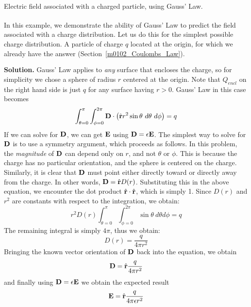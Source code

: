 ~\\ \begin{example} 
\begin{mdframed}[backgroundcolor=brown!20,linecolor=brown!20]\raggedright
Electric field associated with a charged particle, using Gauss' Law.
\\~\\
In this example, we demonstrate the ability of Gauss' Law to predict the field associated with a charge distribution.
Let us do this for the simplest possible charge distribution. A particle of charge $q$ located at the origin, for which we already have the answer (Section~\ref{m0102_Coulombs_Law}).

{\bf Solution.}
Gauss' Law applies to {\it any} surface that encloses the charge, so for simplicity we chose a sphere of radius $r$ centered at the origin.  Note that $Q_{encl}$ on the right hand side is just $q$ for any surface having $r>0$.  Gauss' Law in this case becomes
%
\begin{equation}   
\int_{\theta=0}^{\pi} \int_{\phi=0}^{2\pi} { {\bf D} \cdot \left(\hat{\bf r}r^2 \sin\theta~d\theta~d\phi\right) } = q 
\end{equation}
%
If we can solve for ${\bf D}$, we can get ${\bf E}$ using ${\bf D} = \epsilon {\bf E}$.
The simplest way to solve for ${\bf D}$ is to use a symmetry 
argument, which proceeds as follows. In this problem, the {\it magnitude} of ${\bf D}$ can depend only on $r$, and not $\theta$ or $\phi$. This is because the charge has no particular orientation, and the sphere is centered on the charge.  Similarly, it is clear that ${\bf D}$ must point either directly toward or directly away from the charge.  In other words, ${\bf D} = \hat{\bf r}D(r)$.  Substituting this in the above equation, we encounter the dot product $\hat{\bf r}
\cdot \hat{\bf r}$, which is simply 1.  Since $D(r)$ and $r^2$ are constants with respect to the integration, we obtain:
%
\begin{equation}   
r^2 D(r)  \int_{\theta=0}^{\pi} \int_{\phi=0}^{2\pi} { \sin\theta~d\theta d\phi } = q 
\end{equation}
%
The remaining integral is simply $4\pi$, thus we obtain:
%
\begin{equation}   
D(r)  = \frac{q}{4\pi r^2}
\end{equation}
%
Bringing the known vector orientation of ${\bf D}$ back into the equation, we obtain 
%
\begin{equation}   
{\bf D}  = \hat{\bf r}\frac{q}{4\pi r^2}
\end{equation}
%
and finally using ${\bf D} = \epsilon {\bf E}$ we obtain the expected result
%
\begin{equation}   
{\bf E}  = \hat{\bf r}\frac{q}{4\pi\epsilon r^2}
\end{equation}
\end{mdframed}\end{example}

